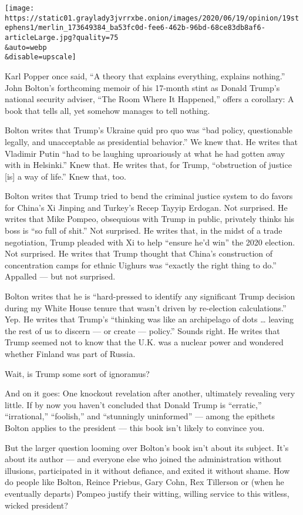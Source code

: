 \texttt{[image: https://static01.graylady3jvrrxbe.onion/images/2020/06/19/opinion/19stephens1/merlin\_173649384\_ba53fc0d-fee6-462b-96bd-68ce83db8af6-articleLarge.jpg?quality=75\\\&auto=webp\\\&disable=upscale]}

Karl Popper once said, ``A theory that explains everything, explains
nothing.'' John Bolton's forthcoming memoir of his 17-month stint as
Donald Trump's national security adviser, ``The Room Where It
Happened,'' offers a corollary: A book that tells all, yet somehow
manages to tell nothing.

Bolton writes that Trump's Ukraine quid pro quo was ``bad policy,
questionable legally, and unacceptable as presidential behavior.'' We
knew that. He writes that Vladimir Putin ``had to be laughing
uproariously at what he had gotten away with in Helsinki.'' Knew that.
He writes that, for Trump, ``obstruction of justice {[}is{]} a way of
life.'' Knew that, too.

Bolton writes that Trump tried to bend the criminal justice system to do
favors for China's Xi Jinping and Turkey's Recep Tayyip Erdogan. Not
surprised. He writes that Mike Pompeo, obsequious with Trump in public,
privately thinks his boss is ``so full of shit.'' Not surprised. He
writes that, in the midst of a trade negotiation, Trump pleaded with Xi
to help ``ensure he'd win'' the 2020 election. Not surprised. He writes
that Trump thought that China's construction of concentration camps for
ethnic Uighurs was ``exactly the right thing to do.'' Appalled --- but
not surprised.

Bolton writes that he is ``hard-pressed to identify any significant
Trump decision during my White House tenure that wasn't driven by
re-election calculations.'' Yep. He writes that Trump's ``thinking was
like an archipelago of dots \ldots{} leaving the rest of us to discern
--- or create --- policy.'' Sounds right. He writes that Trump seemed
not to know that the U.K. was a nuclear power and wondered whether
Finland was part of Russia.

Wait, is Trump some sort of ignoramus?

And on it goes: One knockout revelation after another, ultimately
revealing very little. If by now you haven't concluded that Donald Trump
is ``erratic,'' ``irrational,'' ``foolish,'' and ``stunningly
uninformed'' --- among the epithets Bolton applies to the president ---
this book isn't likely to convince you.

But the larger question looming over Bolton's book isn't about its
subject. It's about its author --- and everyone else who joined the
administration without illusions, participated in it without defiance,
and exited it without shame. How do people like Bolton, Reince Priebus,
Gary Cohn, Rex Tillerson or (when he eventually departs) Pompeo justify
their witting, willing service to this witless, wicked president?

